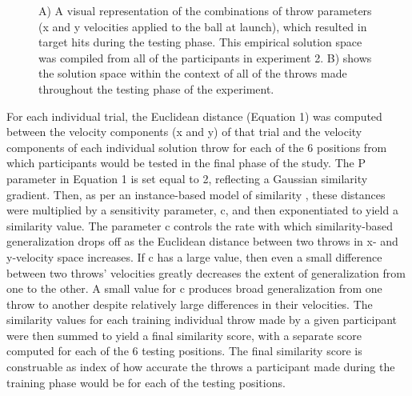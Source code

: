 \documentclass[
  12pt,
  letterpaper,
]{article}
\begin{document}
\begin{figure}


\caption{\label{fig-taskSpace}A) A visual representation of the
combinations of throw parameters (x and y velocities applied to the ball
at launch), which resulted in target hits during the testing phase. This
empirical solution space was compiled from all of the participants in
experiment 2. B) shows the solution space within the context of all of
the throws made throughout the testing phase of the experiment.}

\end{figure}%

For each individual trial, the Euclidean distance (Equation 1) was
computed between the velocity components (x and y) of that trial and the
velocity components of each individual solution throw for each of the 6
positions from which participants would be tested in the final phase of
the study. The P parameter in Equation 1 is set equal to 2, reflecting a
Gaussian similarity gradient. Then, as per an instance-based model of
similarity
\autocite{loganInstanceTheoryAttention2002a,nosofskySimilarityScalingCognitive1992},
these distances were multiplied by a sensitivity parameter, c, and then
exponentiated to yield a similarity value. The parameter c controls the
rate with which similarity-based generalization drops off as the
Euclidean distance between two throws in x- and y-velocity space
increases. If c has a large value, then even a small difference between
two throws' velocities greatly decreases the extent of generalization
from one to the other. A small value for c produces broad generalization
from one throw to another despite relatively large differences in their
velocities. The similarity values for each training individual throw
made by a given participant were then summed to yield a final similarity
score, with a separate score computed for each of the 6 testing
positions. The final similarity score is construable as index of how
accurate the throws a participant made during the training phase would
be for each of the testing positions.
\end{document}
